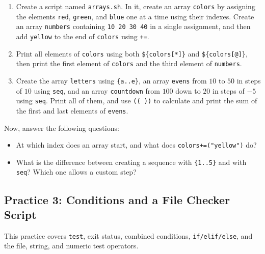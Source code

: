 \begin{enumerate}
    \item Create a script named \texttt{arrays.sh}. In it, create an array \texttt{colors} by assigning the elements \texttt{red}, \texttt{green}, and \texttt{blue} one at a time using their indexes. Create an array \texttt{numbers} containing \texttt{10 20 30 40} in a single assignment, and then add \texttt{yellow} to the end of \texttt{colors} using \texttt{+=}.
    \item Print all elements of \texttt{colors} using both \texttt{\$\{colors[*]\}} and \texttt{\$\{colors[@]\}}, then print the first element of \texttt{colors} and the third element of \texttt{numbers}.
    \item Create the array \texttt{letters} using \texttt{\{a..e\}}, an array \texttt{evens} from $10$ to $50$ in steps of $10$ using \texttt{seq}, and an array \texttt{countdown} from $100$ down to $20$ in steps of $-5$ using \texttt{seq}. Print all of them, and use \texttt{(( ))} to calculate and print the sum of the first and last elements of \texttt{evens}.
\end{enumerate}

Now, answer the following questions:
\begin{itemize}
    \item At which index does an array start, and what does \texttt{colors+=("yellow")} do?
    \item What is the difference between creating a sequence with \texttt{\{1..5\}} and with \texttt{seq}? Which one allows a custom step?
\end{itemize}

\subsection{Practice 3: Conditions and a File Checker Script}
This practice covers \texttt{test}, exit status, combined conditions, \texttt{if/elif/else}, and the file, string, and numeric test operators.

